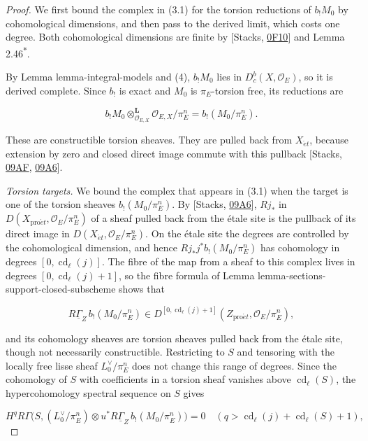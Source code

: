\documentclass[11pt]{article}
\newcommand{\bpout}[1]{#1\textsuperscript{\hyperlink{bp-outside}{\ensuremath{\ast}}}}
\providecommand{\Dbc}{}\renewcommand{\Dbc}{D^b_c}
\begin{document}
\begin{proof}[{Proof}]\label{bp19}%
We first bound the complex in (3.1) for the torsion reductions of \(b_!M_0\) by cohomological dimensions, and then pass to the derived limit, which costs one degree. Both cohomological dimensions are finite by [Stacks, \href{https://stacks.math.columbia.edu/tag/0F10}{0F10}] and Lemma \bpout{2.46}.

By Lemma lemma-integral-models and (4), \(b_!M_0\) lies in \(\Dbc(X,\mathcal O_E)\), so it is derived complete. Since \(b_!\) is exact and \(M_0\) is \(\pi_E\)-torsion free, its reductions are

\[
b_!M_0\otimes^{\mathbf L}_{\mathcal O_{E,X}}\mathcal O_{E,X}/\pi_E^n
=b_!(M_0/\pi_E^n).
\]

These are constructible torsion sheaves. They are pulled back from \(X_{\acute{e}t}\), because extension by zero and closed direct image commute with this pullback [Stacks, \href{https://stacks.math.columbia.edu/tag/09AF}{09AF}, \href{https://stacks.math.columbia.edu/tag/09A6}{09A6}].

\emph{Torsion targets.} We bound the complex that appears in (3.1) when the target is one of the torsion sheaves \(b_!(M_0/\pi_E^n)\). By [Stacks, \href{https://stacks.math.columbia.edu/tag/09A6}{09A6}], \(Rj_*\) in \(D(X_{\mathrm{pro}\acute{e}t},\mathcal O_E/\pi_E^n)\) of a sheaf pulled back from the étale site is the pullback of its direct image in \(D(X_{\acute{e}t},\mathcal O_E/\pi_E^n)\). On the étale site the degrees are controlled by the cohomological dimension, and hence \(Rj_*j^*b_!(M_0/\pi_E^n)\) has cohomology in degrees \([0,\operatorname{cd}_\ell(j)]\). The fibre of the map from a sheaf to this complex lives in degrees \([0,\operatorname{cd}_\ell(j)+1]\), so the fibre formula of Lemma lemma-sections-support-closed-subscheme shows that

\[
R\underline\Gamma_Z\,b_!(M_0/\pi_E^n)\in D^{[0,\operatorname{cd}_\ell(j)+1]}(Z_{\mathrm{pro}\acute{e}t},\mathcal O_E/\pi_E^n),
\]

and its cohomology sheaves are torsion sheaves pulled back from the étale site, though not necessarily constructible. Restricting to \(S\) and tensoring with the locally free lisse sheaf \(L_0^\vee/\pi_E^n\) does not change this range of degrees. Since the cohomology of \(S\) with coefficients in a torsion sheaf vanishes above \(\operatorname{cd}_\ell(S)\), the hypercohomology spectral sequence on \(S\) gives

\[
H^q R\Gamma\bigl(S,(L_0^\vee/\pi_E^n)\otimes u^*R\underline\Gamma_Z\,b_!(M_0/\pi_E^n)\bigr)=0
\quad(q>\operatorname{cd}_\ell(j)+\operatorname{cd}_\ell(S)+1),
\tag{5.2}
\]


\end{proof}
\end{document}
